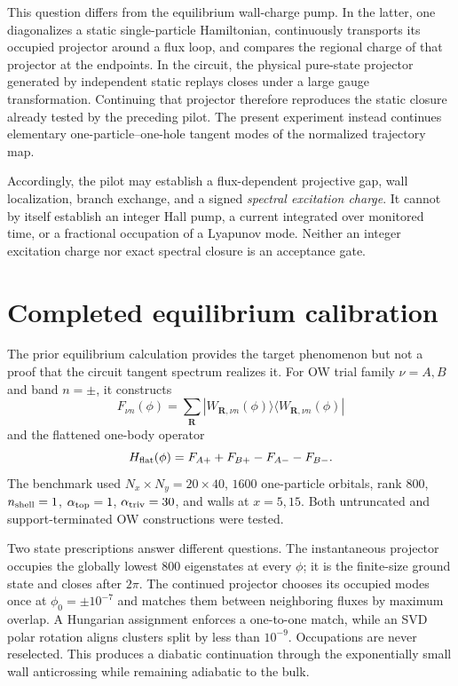 \documentclass[aps,prb,twocolumn,floatfix,nofootinbib,superscriptaddress]{revtex4-2}
\begin{document}
This question differs from the equilibrium wall-charge pump.  In the latter,
one diagonalizes a static single-particle Hamiltonian, continuously transports
its occupied projector around a flux loop, and compares the regional charge of
that projector at the endpoints.  In the circuit, the physical pure-state
projector generated by independent static replays closes under a large gauge
transformation.  Continuing that projector therefore reproduces the static
closure already tested by the preceding pilot.  The present experiment instead
continues elementary one-particle--one-hole tangent modes of the normalized
trajectory map.

Accordingly, the pilot may establish a flux-dependent projective gap, wall
localization, branch exchange, and a signed \emph{spectral excitation charge}.
It cannot by itself establish an integer Hall pump, a current integrated over
monitored time, or a fractional occupation of a Lyapunov mode.  Neither an
integer excitation charge nor exact spectral closure is an acceptance gate.

\section{Completed equilibrium calibration}
\label{sec:equilibrium}

The prior equilibrium calculation provides the target phenomenon but not a
proof that the circuit tangent spectrum realizes it.  For OW trial family
$\nu=A,B$ and band $n=\pm$, it constructs
\begin{equation}
 F_{\nu n}(\phi)=\sum_{\bm R}
 |W_{\bm R,\nu n}(\phi)\rangle
 \langle W_{\bm R,\nu n}(\phi)|
\end{equation}
and the flattened one-body operator
\begin{equation}
 H_{\rm flat}(\phi)=F_{A+}+F_{B+}-F_{A-}-F_{B-}.
 \label{eq:hflat}
\end{equation}
The benchmark used $N_x\times N_y=20\times40$, $1600$ one-particle
orbitals, rank 800, $n_{\rm shell}=1$, $\alpha_{\rm top}=1$,
$\alpha_{\rm triv}=30$, and walls at $x=5,15$.  Both untruncated and
support-terminated OW constructions were tested.

Two state prescriptions answer different questions.  The instantaneous
projector occupies the globally lowest 800 eigenstates at every $\phi$; it is
the finite-size ground state and closes after $2\pi$.  The continued projector
chooses its occupied modes once at $\phi_0=\pm10^{-7}$ and matches them between
neighboring fluxes by maximum overlap.  A Hungarian assignment enforces a
one-to-one match, while an SVD polar rotation aligns clusters split by less
than $10^{-9}$.  Occupations are never reselected.  This produces a diabatic
continuation through the exponentially small wall anticrossing while
remaining adiabatic to the bulk.
\end{document}
